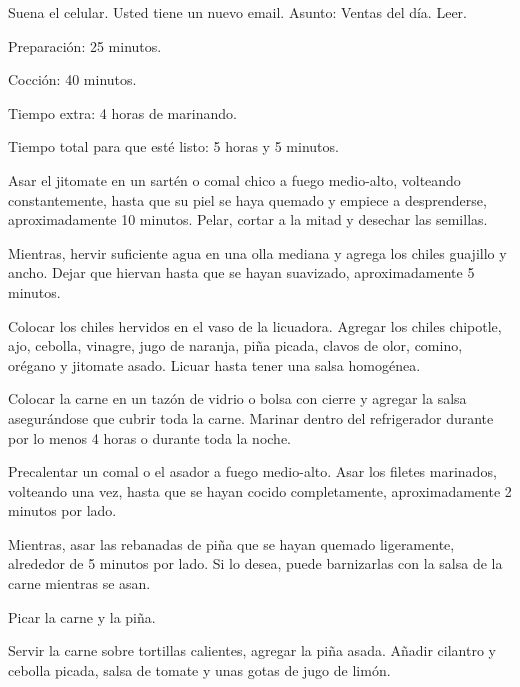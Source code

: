 \documentclass[12pt,twoside,openright,a5paper]{book}
\begin{document}
Suena el celular. Usted tiene un nuevo email. Asunto: Ventas del día. Leer.


\vspace{0.5cm}
\hrulefill\hspace{0.2cm} \decofourleft\decofourright \hspace{0.2cm} \hrulefill
\vspace{0.5cm}

Preparación: 25 minutos.

Cocción: 40 minutos.

Tiempo extra: 4 horas de marinando.

Tiempo total para que esté listo: 5 horas y 5 minutos.

Asar el jitomate en un sartén o comal chico a fuego medio-alto, volteando
constantemente, hasta que su piel se haya quemado y empiece a desprenderse,
aproximadamente 10 minutos. Pelar, cortar a la mitad y desechar las semillas.

Mientras, hervir suficiente agua en una olla mediana y agrega los
chiles guajillo y ancho. Dejar que hiervan hasta que se hayan suavizado,
aproximadamente 5 minutos.

Colocar los chiles hervidos en el vaso de la licuadora. Agregar los
chiles chipotle, ajo, cebolla, vinagre, jugo de naranja, piña picada,
clavos de olor, comino, orégano y jitomate asado. Licuar hasta tener una
salsa homogénea.

Colocar la carne en un tazón de vidrio o bolsa con cierre y agregar la
salsa asegurándose que cubrir toda la carne. Marinar dentro del refrigerador
durante por lo menos 4 horas o durante toda la noche.

Precalentar un comal o el asador a fuego medio-alto. Asar los filetes
marinados, volteando una vez, hasta que se hayan cocido completamente,
aproximadamente 2 minutos por lado.

Mientras, asar las rebanadas de piña que se hayan quemado ligeramente,
alrededor de 5 minutos por lado. Si lo desea, puede barnizarlas con la
salsa de la carne mientras se asan.

Picar la carne y la piña.

Servir la carne sobre tortillas calientes, agregar la piña asada. Añadir
cilantro y cebolla picada, salsa de tomate y unas gotas de jugo de limón.


\vspace{0.5cm}
\hrulefill\hspace{0.2cm} \decofourleft\decofourright \hspace{0.2cm} \hrulefill
\vspace{0.5cm}
\end{document}
